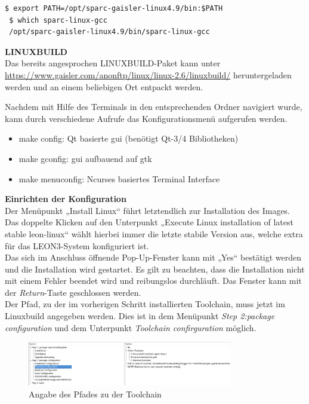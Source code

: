 \begin{lstlisting}[caption={Anpassen der Umgebungsvariablen},label={code:linuxpath}]
$ export PATH=/opt/sparc-gaisler-linux4.9/bin:$PATH
 $ which sparc-linux-gcc
 /opt/sparc-gaisler-linux4.9/bin/sparc-linux-gcc
\end{lstlisting}

\vspace{2mm}
\textbf{LINUXBUILD}\\

Das bereits angesprochen LINUXBUILD-Paket kann unter \url{https://www.gaisler.com/anonftp/linux/linux-2.6/linuxbuild/} heruntergeladen werden und an einem beliebigen Ort entpackt werden.

Nachdem mit Hilfe des Terminals in den entsprechenden Ordner navigiert wurde, kann durch verschiedene Aufrufe das Konfigurationsmenü aufgerufen werden.

\begin{itemize}
\item make config: Qt basierte \acs{gui} (benötigt Qt-3/4 Bibliotheken)
\item make gconfig: \ac{gui} aufbauend auf \ac{gtk}
\item make menuconfig: Ncurses basiertes Terminal Interface
\end{itemize}

\textbf{Einrichten der Konfiguration}\\

Der Menüpunkt „Install Linux“ führt letztendlich zur Installation des Images.
 Das doppelte Klicken auf den Unterpunkt „Execute Linux installation of latest stable leon-linux“ wählt hierbei immer die letzte stabile Version aus, welche extra für das LEON3-System konfiguriert ist. \\
Das sich im Anschluss öffnende Pop-Up-Fenster kann mit „Yes“ bestätigt werden und die Installation wird gestartet.
Es gilt zu beachten, dass die Installation nicht mit einem Fehler beendet wird und reibungslos durchläuft. Das Fenster kann mit der \emph{Return}-Taste geschlossen werden.\\

Der Pfad, zu der im vorherigen Schritt installierten Toolchain, muss jetzt im Linuxbuild angegeben werden.
Dies ist in dem Menüpunkt \emph{Step 2:package configuration} und dem Unterpunkt \emph{Toolchain confirguration} möglich.\\

\begin{figure}[H]
\centering
\includegraphics[width=0.8\textwidth]{Hauptteil/toolchainconf.png}
\caption{Angabe des Pfades zu der Toolchain}
\label{fig:toolchainconf}
\end{figure}

